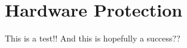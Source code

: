 \newpage
{}
\section{Hardware Protection} \label{hardwareprotection}
This is a test!! And this is hopefully a success??
